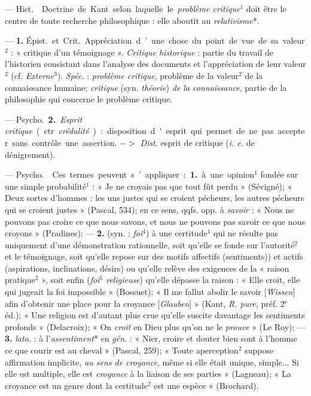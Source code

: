 \begin{itemize}[leftmargin=1cm, label=, itemsep=11pt]
 — \si{Hist.}  Doctrine de
Kant selon laquelle le {\it problème
critique}$^1$ doit être le centre de toute
recherche philosophique : elle aboutit
au {\it relativisme}*.

 — {\bf 1.} \si{Épist.} et \si{Crit.} Appréciation d’une chose du point de vue
de sa valeur$^2$ : « critique d’un témoignage ».
{\it Critique historique} : partie
du travail de l'historien consistant
dans l'analyse des documents et
l'appréciation de leur valeur$^2$ (cf.
{\it Externe}$^3$). {\it Spéc.} : {\it problème critique},
problème de la valeur$^2$ de la connaissance humaine; {\it critique} (syn.
{\it théorie}) {\it de la connaissance}, partie de
la philosophie qui concerne le problème critique.

— \si{Psycho.} {\bf 2.} {\it Esprit critique} (ctr.
{\it crédulité}) : disposition d'esprit qui
permet de ne pas accepter sans contrôle une assertion. $->$ {\it Dist.} esprit
de critique ({\it i. e.} de dénigrement).

 — \si{Psycho.}  Ces
termes peuvent s’appliquer : {\bf 1.} à
une opinion$^1$ fondée sur une simple
probabilité$^1$ : « Je ne croyais pas que
tout fût perdu » (Sévigné); « Deux
sortes d'hommes : les uns justes qui
se croient pécheurs, les autres pécheurs qui se croient justes » (Pascal,
534); en ce sens, qqfs. opp. à {\it savoir} :
« Nous ne pouvons pas croire ce que
nous savons, et nous ne pouvons
pas savoir ce que nous croyons »
(Pradines); — {\bf 2.} (syn. : {\it foi}$^4$) à une
certitude$^1$ qui ne résulte pas uniquement d'une démonstration rationnelle, soit qu’elle se fonde sur l’autorité$^2$ et le témoignage, soit qu'elle
repose sur des motifs affectifs (sentiments)) et actifs (aspirations, inclinations, désirs) ou qu'elle relève des
exigences de la « raison pratique$^2$ »,
soit enfin ({\it foi$^5$ religieuse}) qu’elle
dépasse la raison : « Elle croit, elle
qui jugeait la foi impossible »
(Bossuet); « Il me fallut abolir le
savoir [{\it Wissen}] afin d'obtenir une
place pour la croyance [{\it Glauben}] »
(Kant, {\it R. pure}, préf. 2$^\text{e}$ éd.); « Une
religion est d’autant plus crue qu’elle
suscite davantage les sentiments
profonds » (Delacroix); « On {\it croit} en
Dieu plus qu’on ne le {\it prouve} » (Le
Roy); — {\bf 3.} {\it lato.} : à l'{\it assentiment}* en
 {\it gén.} : « Nier, croire et douter bien
sont à l’homme ce que courir est au
cheval » (Pascal, 259); « Toute aperception$^2$ suppose affirmation implicite, {\it au sens de croyance}, même si
elle était unique, simple... Si elle
est multiple, elle est {\it croyance} à la
liaison de ses parties » (Lagneau);
« La croyance est un genre dont
la certitude$^2$ est une espèce » (Brochard).


\end{itemize}
